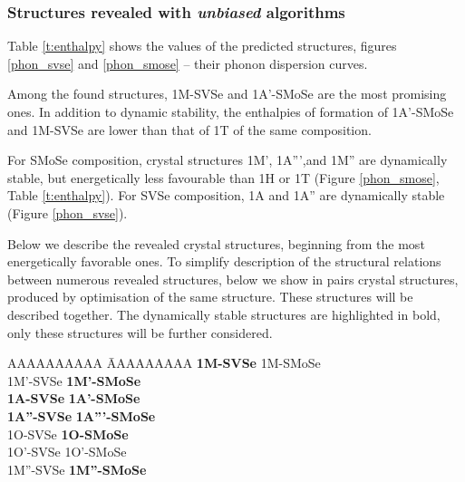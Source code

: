 \documentclass[a4paperm]{article}
\begin{document}
\subsubsection{Structures revealed with {\it unbiased} algorithms}
Table \ref{t:enthalpy} shows the values of the predicted structures, figures \ref{phon_svse} and  \ref{phon_smose} -- their phonon dispersion curves. 

Among the found structures, 1M-SVSe and 1A'-SMoSe are the most promising ones.
In addition to dynamic stability, the enthalpies of formation of 1A'-SMoSe and 1M-SVSe are lower than that of 1T of the same composition. 

For SMoSe composition, crystal structures 1M', 1A''',and 1M'' are dynamically stable, but energetically less favourable than 1H or 1T (Figure \ref{phon_smose}, Table \ref{t:enthalpy}).
For SVSe composition, 1A and 1A'' are dynamically stable (Figure \ref{phon_svse}). 

Below we describe the revealed crystal structures, beginning from the most energetically favorable ones.
To simplify description of the structural relations between numerous revealed structures, below we show in pairs crystal structures, produced by optimisation of the same structure.
These structures will be described together.
The dynamically stable structures are highlighted in bold, only these structures will be further considered.

\begin{tabbing} \centering
	AAAAAAAAAA \= AAAAAAAAA \kill
	{\bf 1M-SVSe} \> 1M-SMoSe \\
	1M'-SVSe \> {\bf 1M'-SMoSe} \\
	{\bf 1A-SVSe} \> {\bf 1A'-SMoSe} \\
	{\bf 1A''-SVSe} \> {\bf 1A'''-SMoSe} \\
	
	1O-SVSe \> {\bf 1O-SMoSe} \\
	1O'-SVSe \> 1O'-SMoSe \\
	1M''-SVSe \> {\bf 1M''-SMoSe}
\end{tabbing}
\end{document}
